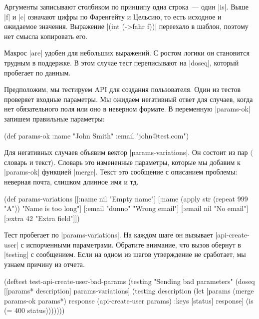 Аргументы записывают столбиком по принципу одна строка~--- один
\spverb|is|. Выше \spverb|f| и \spverb|c| означают цифры по Фаренгейту и
Цельсию, то есть исходное и ожидаемое значения. Выражение \spverb|(int (->fahr f))|
переехало в шаблон, поэтому нет смысла копировать его.

Макрос \spverb|are| удобен для небольших выражений. С ростом логики он
становится трудным в поддержке. В этом случае тест переписывают на
\spverb|doseq|, который пробегает по данным.

Предположим, мы тестируем API для создания пользователя. Один из тестов
проверяет входные параметры. Мы ожидаем негативный ответ для случаев, когда нет
обязательного поля или оно в неверном формате. В переменную \spverb|params-ok|
запишем правильные параметры:

\begin{english}
  \begin{clojure}
(def params-ok {:name "John Smith" :email "john@test.com"})
  \end{clojure}
\end{english}

Для негативных случаев объявим вектор \spverb|params-variations|. Он состоит из
пар $\langle$словарь и текст$\rangle$. Словарь это измененные параметры, которые
мы добавим к \spverb|params-ok| функцией \spverb|merge|. Текст это сообщение с
описанием проблемы: неверная почта, слишком длинное имя и тд.

\begin{english}
  \begin{clojure}
(def params-variations
  [[{:name nil} "Empty name"]
   [{:name (apply str (repeat 999 "A"))} "Name is too long"]
   [{:email "dunno"} "Wrong email"]
   [{:email nil} "No email"]
   [{:extra 42} "Extra field"]])
  \end{clojure}
\end{english}

Тест пробегает по \spverb|params-variations|. На каждом шаге он вызывает
\spverb|api-create-user| с испорченными параметрами. Обратите внимание, что
вызов обернут в \spverb|testing| с сообщением. Если на одном из шагов
утверждение не сработает, мы узнаем причину из отчета.

\begin{english}
  \begin{clojure}
(deftest test-api-create-user-bad-params
  (testing "Sending bad parameters"
    (doseq [[params* description] params-variations]
      (testing description
        (let [params (merge params-ok params*)
              response (api-create-user params)
              {:keys [status]} response]
          (is (= 400 status)))))))
  \end{clojure}
\end{english}

